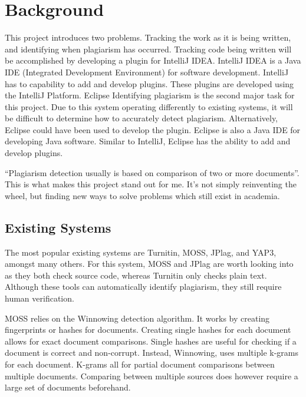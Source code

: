 \chapter{Background}
\label{chp:background}
This project introduces two problems. Tracking the work as it is being written, and identifying when plagiarism has occurred. Tracking code being written will be accomplished by developing a plugin for IntelliJ IDEA. IntelliJ IDEA is a Java IDE (Integrated Development Environment) for software development. IntelliJ has to capability to add and develop plugins. These plugins are developed using the IntelliJ Platform\cite{IntelliJPlatform}. Eclipse  Identifying plagiarism is the second major task for this project. Due to this system operating differently to existing systems, it will be difficult to determine how to accurately detect plagiarism. Alternatively, Eclipse could have been used to develop the plugin. Eclipse is also a Java IDE for developing Java software. Similar to IntelliJ, Eclipse has the ability to add and develop plugins.

``Plagiarism detection usually is based on comparison of two or more documents''\cite{Lukashenko2007}. This is what makes this project stand out for me. It's not simply reinventing the wheel, but finding new ways to solve problems which still exist in academia. 

\section{Existing Systems}
\label{sec:existing-systems}
The most popular existing systems are Turnitin, MOSS, JPlag, and YAP3, amongst many others. For this system, MOSS and JPlag are worth looking into as they both check source code, whereas Turnitin only checks plain text\cite{Lukashenko2007}. Although these tools can automatically identify plagiarism, they still require human verification.

MOSS relies on the Winnowing detection algorithm. It works by creating fingerprints or hashes for documents\cite{Schleimer2003}. Creating single hashes for each document allows for exact document comparisons. Single hashes are useful for checking if a document is correct and non-corrupt. Instead, Winnowing, uses multiple k-grams for each document. K-grams all for partial document comparisons between multiple documents. Comparing between multiple sources does however require a large set of documents beforehand.

